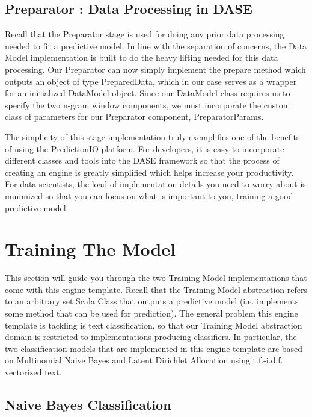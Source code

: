 \documentclass[a4paper,12pt]{article}
\newcommand{\3}{\left}
\newcommand{\4}{\right}
\renewcommand{\-}[1]{{}^{-#1}}
\begin{document}
\subsection*{Preparator : Data Processing in DASE}

Recall that the Preparator stage is used for doing any prior data processing needed to fit a predictive model. In line with the separation of concerns, the Data Model implementation is built to do the heavy lifting needed for this data processing. Our Preparator can now simply implement the prepare method which outputs an object of type PreparedData, which in our case serves as a wrapper for an initialized DataModel object. Since our DataModel class requires us to specify the two n-gram window components, we must incorporate the custom class of parameters for our Preparator component, PreparatorParams. 

The simplicity of this stage implementation truly exemplifies one of the benefits of using the PredictionIO platform. For developers, it is easy to incorporate different classes and tools into the DASE framework so that the process of creating an engine is greatly simplified which helps increase your productivity. For data scientists, the load of implementation details you need to worry about is minimized so that you can focus on what is important to you, training a good predictive model. 

\section*{Training The Model}

This section will guide you through the two Training Model implementations that come with this engine template. Recall that the Training Model abstraction refers to an arbitrary set Scala Class that outputs a predictive model (i.e. implements some method that can be used for prediction). The general problem this engine template is tackling is text classification, so that our Training Model abstraction domain is restricted to implementations producing classifiers. In particular, the two classification models that are implemented in this engine template are based on Multinomial Naive Bayes and Latent Dirichlet Allocation using t.f.-i.d.f. vectorized text. 

\subsection*{Naive Bayes Classification}
\end{document}
